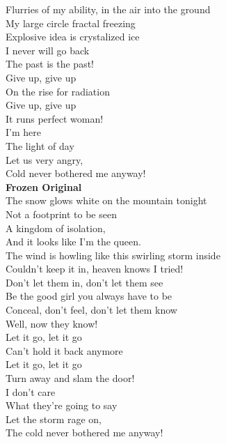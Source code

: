 \documentclass[letterpaper,10pt]{article}
\begin{document}
\begin{paracol}{2}
Flurries of my ability, in the air into the ground\\
My large circle fractal freezing\\
Explosive idea is crystalized ice\\
I never will go back\\
The past is the past!\\

Give up, give up\\
On the rise for radiation\\
Give up, give up\\
It runs perfect woman!\\

I'm here\\
The light of day\\
Let us very angry,\\
Cold never bothered me anyway!\\

\switchcolumn
\textbf{Frozen Original}\\

The snow glows white on the mountain tonight\\
Not a footprint to be seen\\
A kingdom of isolation,\\
And it looks like I'm the queen.\\

The wind is howling like this swirling storm inside\\
Couldn't keep it in, heaven knows I tried!\\

Don't let them in, don't let them see\\
Be the good girl you always have to be\\
Conceal, don't feel, don't let them know\\
Well, now they know!\\

Let it go, let it go\\
Can't hold it back anymore\\
Let it go, let it go\\
Turn away and slam the door!\\

I don't care\\
What they're going to say\\
Let the storm rage on,\\
The cold never bothered me anyway!\\


\end{paracol}
\end{document}
